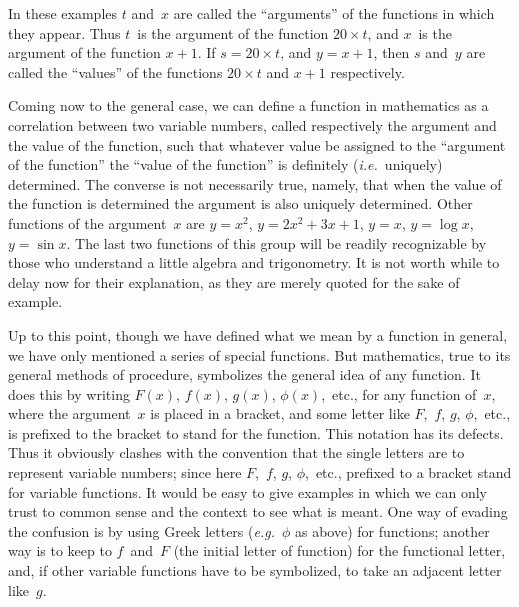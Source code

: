 \documentclass[12pt,leqno]{book}[2005/09/16]
\newcommand{\PageSep}[1]{\ignorespaces}
\newcommand{\eg}{\emph{e.g.}}
\newcommand{\ie}{\emph{i.e.}}
\begin{document}
In these examples $t$ and~$x$ are called the
\PageSep{146}
%
%
``arguments'' of the functions in which they
appear. Thus $t$~is the argument of the function
$20 × t$, and $x$~is the argument of the function
$x + 1$. If $s = 20 × t$, and $y = x + 1$, then $s$
and~$y$ are called the ``values'' of the functions
$20 × t$ and $x + 1$ respectively.

Coming now to the general case, we can
define a function in mathematics as a correlation
between two variable numbers, called
respectively the argument and the value of
the function, such that whatever value be
assigned to the ``argument of the function''
the ``value of the function'' is definitely
(\ie~uniquely) determined. The converse
is not necessarily true, namely, that when
the value of the function is determined
the argument is also uniquely determined.
Other functions of the argument~$x$ are $y = x^{2}$,
$y = 2x^{2} + 3x + 1$, $y = x$, $y = \log x$, $y = \sin x$. The
last two functions of this group will be
readily recognizable by those who understand
a little algebra and trigonometry. It is not
worth while to delay now for their explanation,
as they are merely quoted for the sake
of example.

Up to this point, though we have defined
what we mean by a function in general, we
have only mentioned a series of special functions.
But mathematics, true to its general
methods of procedure, symbolizes the general
idea of any function. It does this by writing
\PageSep{147}
%
$F(x)$, $f(x)$, $g(x)$, $\phi(x)$,~etc., for any function of~$x$,
where the argument~$x$ is placed in a bracket,
and some letter like $F$,~$f$, $g$, $\phi$,~etc., is prefixed
to the bracket to stand for the function.
This notation has its defects. Thus it obviously
clashes with the convention that the
single letters are to represent variable numbers;
since here $F$,~$f$, $g$, $\phi$,~etc., prefixed to a
bracket stand for variable functions. It
would be easy to give examples in which we
can only trust to common sense and the context
to see what is meant. One way of
evading the confusion is by using Greek
letters (\eg~$\phi$ as above) for functions; another
way is to keep to $f$~and~$F$ (the initial
letter of function) for the functional letter,
and, if other variable functions have to be
symbolized, to take an adjacent letter like~$g$.
\end{document}
